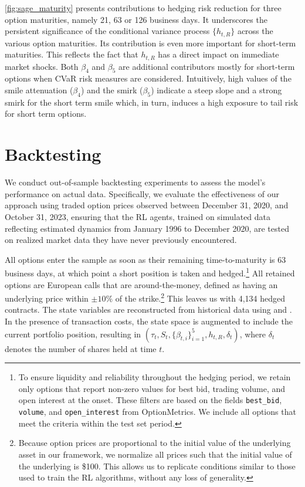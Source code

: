 \documentclass[12pt]{article}
\begin{document}
\autoref{fig:sage_maturity} presents contributions to hedging risk reduction for three option maturities, namely 21, 63 or 126 business days. It underscores the persistent significance of the conditional variance process \( \{h_{t,R}\} \) across the various option maturities. Its contribution is even more important for short-term maturities. This reflects the fact that \( h_{t,R} \) has a direct impact on immediate market shocks.
Both $\beta_4$ and $\beta_5$ are additional contributors mostly for short-term options when CVaR risk measures are considered. Intuitively, high values of the smile attenuation ($\beta_4$) and the smirk ($\beta_5$) indicate a steep slope and a strong smirk for the short term smile which, in turn, induces a high exposure to tail risk for short term options.

\section{Backtesting} \label{subsub:benchmarking_realpaths}

We conduct out-of-sample backtesting experiments to assess the model’s performance on actual data. Specifically, we evaluate the effectiveness of our approach using traded option prices observed between December 31, 2020, and October 31, 2023, ensuring that the RL agents, trained on simulated data reflecting estimated dynamics from January 1996 to December 2020, are tested on realized market data they have never previously encountered.

All options enter the sample as soon as their remaining time-to-maturity is 63 business days, at which point a short position is taken and hedged.\footnote{
    To ensure liquidity and reliability throughout the hedging period, we retain only options that report non-zero values for best bid, trading volume, and open interest at the onset. These filters are based on the fields \texttt{best\_bid}, \texttt{volume}, and \texttt{open\_interest} from OptionMetrics. We include all options that meet the criteria within the test set period.}
    All retained options are European calls that are around-the-money, defined as having an underlying price within $\pm10\%$ of the strike.\footnote{Because option prices are proportional to the initial value of the underlying asset in our framework, we normalize all prices such that the initial value of the underlying is \$100. This allows us to replicate conditions similar to those used to train the RL algorithms, without any loss of generality.}
    This leaves us with 4,134 hedged contracts.
The state variables are reconstructed from historical data using \cite{Frnacois2022} and \cite{Frnacois2023}. In the presence of transaction costs, the state space is augmented to include the current portfolio position, resulting in $(\tau_t, S_t, \{\beta_{t,i}\}_{i=1}^5, h_{t,R}, \delta_t)$, where $\delta_t$ denotes the number of shares held at time $t$.
\end{document}
